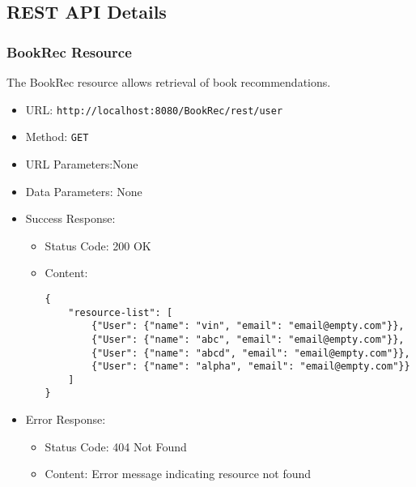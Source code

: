 \subsection{REST API Details}


\subsubsection*{BookRec Resource}


The BookRec resource allows retrieval of book recommendations.


\begin{itemize}
    \item URL: \texttt{http://localhost:8080/BookRec/rest/user}
    \item Method: \texttt{GET}
    \item URL Parameters:None
    \item Data Parameters: None
    \item Success Response: \begin{itemize}
            \item Status Code: 200 OK
            \item Content: 
            \begin{verbatim}
{
    "resource-list": [
        {"User": {"name": "vin", "email": "email@empty.com"}},
        {"User": {"name": "abc", "email": "email@empty.com"}},
        {"User": {"name": "abcd", "email": "email@empty.com"}},
        {"User": {"name": "alpha", "email": "email@empty.com"}}
    ]
}
            \end{verbatim}
        \end{itemize}
    \item Error Response:\begin{itemize}
            \item Status Code: 404 Not Found
            \item Content: Error message indicating resource not found
        \end{itemize}
    
\end{itemize}

